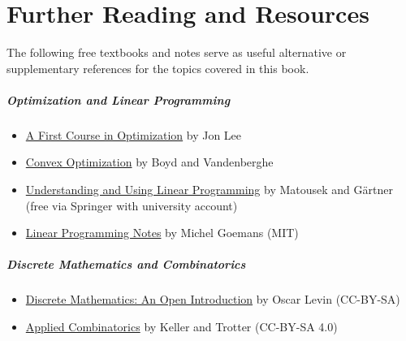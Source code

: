 
\chapter{Further Reading and Resources}

The following free textbooks and notes serve as useful alternative or supplementary references for the topics covered in this book.

\paragraph{\textbf{Optimization and Linear Programming}}
\begin{itemize}
\item \href{http://www.optimization-online.org/DB_FILE/2013/12/4161.pdf}{A First Course in Optimization} by Jon Lee
\item \href{https://web.stanford.edu/~boyd/cvxbook/}{Convex Optimization} by Boyd and Vandenberghe
\item \href{https://www.springer.com/gp/book/9783540306979}{Understanding and Using Linear Programming} by Matousek and G\"artner (free via Springer with university account)
\item \href{http://math.mit.edu/~goemans/18310S15/lpnotes310.pdf}{Linear Programming Notes} by Michel Goemans (MIT)
\end{itemize}

\paragraph{\textbf{Discrete Mathematics and Combinatorics}}
\begin{itemize}
\item \href{http://discrete.openmathbooks.org/dmoi3.html}{Discrete Mathematics: An Open Introduction} by Oscar Levin (CC-BY-SA)
\item \href{http://www.rellek.net/book/frontmatter-1.html}{Applied Combinatorics} by Keller and Trotter (CC-BY-SA 4.0)
\end{itemize}

